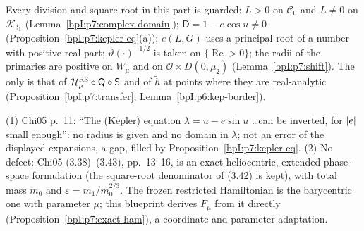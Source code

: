\begin{remark}\label{bpI:p7:totality}
Every division and square root in this part is guarded: $L>0$ on $\mathcal C_0$ and $L\ne0$ on $\mathcal K_{\delta_1}$ (Lemma~\ref{bpI:p7:complex-domain}); $\mathsf D=1-e\cos u\ne0$ (Proposition~\ref{bpI:p7:kepler-eq}(a)); $e(L,G)$ uses a principal root of a number with positive real part; $\vartheta(\cdot)^{-1/2}$ is taken on $\{\operatorname{Re}>0\}$; the radii of the primaries are positive on $W_\mu$ and on $\mathcal O\times D(0,\mu_2)$ (Lemma~\ref{bpI:p7:shift}). The only  is that of $\mathcal H^{\rm R3}_\mu\circ\mathsf Q\circ\mathsf S$ and of $\tilde h$ at points where they are real-analytic (Proposition~\ref{bpI:p7:transfer}, Lemma~\ref{bpI:p6:kep-border}).
\end{remark}

\begin{remark}\label{bpI:p7:errata}
(1) Chi05 p.~11: ``The (Kepler) equation $\lambda=u-e\sin u$ \dots can be inverted, for $\lvert e\rvert$ small enough'': no radius is given and no domain in $\lambda$; not an error of the displayed expansions, a gap, filled by Proposition~\ref{bpI:p7:kepler-eq}.
(2) No defect: Chi05 (3.38)--(3.43), pp.~13--16, is an exact heliocentric, extended-phase-space formulation (the square-root denominator of (3.42) is kept), with total mass $m_0$ and $\varepsilon=m_1/m_0^{2/3}$. The frozen restricted Hamiltonian is the barycentric one with parameter $\mu$; this blueprint derives $F_\mu$ from it directly (Proposition~\ref{bpI:p7:exact-ham}), a coordinate and parameter adaptation.
\end{remark}
